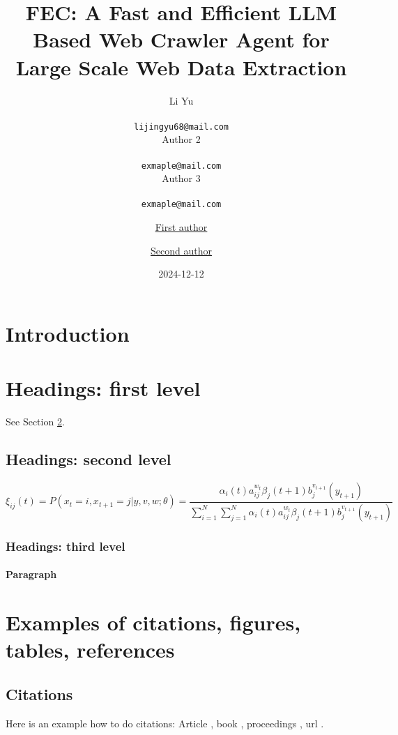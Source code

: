 \documentclass{article}
\title{\large FEC: A Fast and Efficient LLM Based Web Crawler Agent for Large Scale Web Data Extraction}
\date{2024-12-12}
\author{
	\hspace{1mm}Li Yu\\
	\\
	\texttt{lijingyu68@mail.com} \\
	\And
	\hspace{1mm} Author 2\\
	\\
	\texttt{exmaple@mail.com} \\
	\And
	\hspace{1mm} Author 3\\
	\\
	\texttt{exmaple@mail.com} \\
}
\author[1]{%
	\href{https://orcid.org/0000-0000-0000-0000}{\usebox{\orcid}\hspace{1mm}First author}%
}
\author[1,2]{%
	\href{https://orcid.org/0000-0000-0000-0000}{\usebox{\orcid}\hspace{1mm}Second author}%
}
\affil[1]{Affiliation, Address}
\affil[2]{Affiliation, Address}
\begin{document}
\maketitle

\begin{abstract}
	\lipsum[1]
\end{abstract}




\section{Introduction}
\lipsum[2]
\lipsum[3]


\section{Headings: first level}
\label{sec:headings}

\lipsum[4] See Section \ref{sec:headings}.

\subsection{Headings: second level}
\lipsum[5]
\begin{equation}
	\xi _{ij}(t)=P(x_{t}=i,x_{t+1}=j|y,v,w;\theta)= {\frac {\alpha _{i}(t)a^{w_t}_{ij}\beta _{j}(t+1)b^{v_{t+1}}_{j}(y_{t+1})}{\sum _{i=1}^{N} \sum _{j=1}^{N} \alpha _{i}(t)a^{w_t}_{ij}\beta _{j}(t+1)b^{v_{t+1}}_{j}(y_{t+1})}}
\end{equation}

\subsubsection{Headings: third level}
\lipsum[6]

\paragraph{Paragraph}
\lipsum[7]



\section{Examples of citations, figures, tables, references}
\label{sec:others}

\subsection{Citations}
Here is an example how to do citations: Article \cite{ref_article}, book \cite{ref_book}, proceedings \cite{ref_proc}, url  \cite{ref_url}. 
\end{document}
